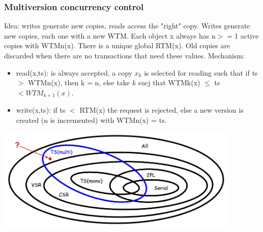 \subsubsection{Multiversion concurrency control}
Idea: writes generate new copies, reads access the
"right" copy.\newline
\newline
Writes generate new copies, each one with a new WTM.
Each object x always has n$>=$1 active copies with
WTMn(x). There is a unique global RTM(x).\newline
\newline
Old copies are discarded when there are no
transactions that need these values.
\newline
\newline
Mechanism:
\begin{itemize}
    \item read(x,ts): is always accepted, a copy $x_k$ is selected for reading such that if ts $>$ WTMn(x), then k = n, else take $k$ sucj that WTMk(x) $\leq$ ts $< WTM_{k+1}(x)$. 
    \item write(x,ts): if ts $<$ RTM(x) the request is rejected, else a new version is created (n is incremented) with WTMn(x) = ts.
\end{itemize}
\begin{center}
    \includegraphics[height=5cm]{../arguments/multiversionts.JPG}
\end{center}